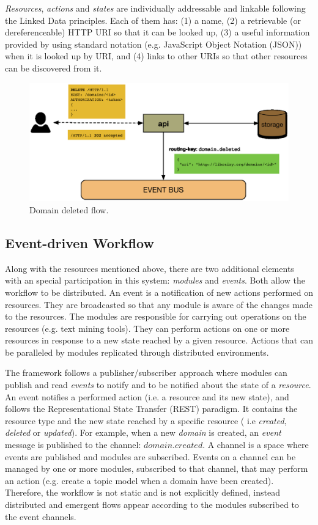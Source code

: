 \textit{Resources}, \textit{actions} and \textit{states} are individually addressable and linkable \cite{Turchi2012a} following the Linked Data principles\cite{Bizer2009}. Each of them has: (1) a name, (2) a retrievable (or dereferenceable) HTTP URI so that it can be looked up, (3) a useful information provided by using standard notation (e.g. JavaScript Object Notation (JSON)) when it is  looked up by URI, and (4) links to other URIs so that other resources can be discovered from it.


\begin{figure}
  \includegraphics[scale=0.35]{api-domain-deleted}
  \caption{Domain deleted flow.}
  \label{fig:librairy-domain-deleted}
\end{figure}



\subsection{Event-driven Workflow}
Along with the resources mentioned above, there are two additional elements with an special participation in this system: \textit{modules} and \textit{events}. Both allow the workflow to be distributed. An event is a notification of new actions performed on resources. They are broadcasted so that any module is aware of the changes made to the resources. The modules are responsible for carrying out operations on the resources (e.g. text mining tools). They can perform actions on one or more resources in response to a new state reached by a given resource. Actions that can be paralleled by modules replicated through distributed environments.

The framework follows a publisher/subscriber approach where modules can publish and read \textit{events} to notify and to be notified about the state of a \textit{resource}. An event notifies a performed action (i.e. a resource and its new state), and follows the Representational State Transfer (REST)\cite{Fielding2002} paradigm. It contains the resource type and the new state reached by a specific resource ( i.e \textit{created}, \textit{deleted} or \textit{updated}). For example, when a new \textit{domain} is created, an \textit{event} message is published to the channel: $domain.created$. A channel is a space where events are published and modules are subscribed. Events on a channel can be managed by one or more modules, subscribed to that channel, that may perform an action (e.g. create a topic model when a domain have been created). Therefore, the workflow is not static and is not explicitly defined, instead distributed and emergent flows appear according to the modules subscribed to the event channels.

